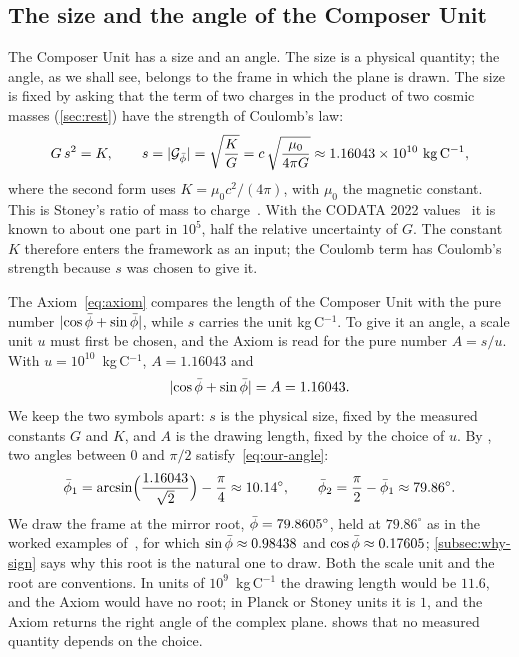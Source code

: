\subsection{The size and the angle of the Composer Unit}\label{subsec:our-plane}

The Composer Unit has a size and an angle. The size is a physical quantity; the angle, as we shall see, belongs to the frame in which the plane is drawn. The size is fixed by asking that the term of two charges in the product of two cosmic masses (\cref{sec:rest}) have the strength of Coulomb's law:
\begin{equation}\label{eq:cu-size}
G\,s^2 = K , \qquad s = \lvert\Gp\rvert = \sqrt{\frac{K}{G}} = c\,\sqrt{\frac{\mu_0}{4\pi G}} \approx 1.16043 \times 10^{10}\ \mathrm{kg\,C^{-1}} ,
\end{equation}
where the second form uses $K = \mu_0 c^2/(4\pi)$, with $\mu_0$ the magnetic constant. This is Stoney's ratio of mass to charge~\citep{Stoney1881}. With the CODATA 2022 values~\citep{CODATA2022} it is known to about one part in $10^5$, half the relative uncertainty of $G$. The constant $K$ therefore enters the framework as an input; the Coulomb term has Coulomb's strength because $s$ was chosen to give it.

The Axiom~\cref{eq:axiom} compares the length of the Composer Unit with the pure number $\lvert\cos\bar{\phi} + \sin\bar{\phi}\rvert$, while $s$ carries the unit kg\,C$^{-1}$. To give it an angle, a scale unit $u$ must first be chosen, and the Axiom is read for the pure number $A = s/u$. With $u = 10^{10}$~kg\,C$^{-1}$, $A = 1.16043$ and
\begin{equation}\label{eq:our-angle}
\lvert\cos\bar{\phi} + \sin\bar{\phi}\rvert = A = 1.16043 .
\end{equation}
We keep the two symbols apart: $s$ is the physical size, fixed by the measured constants $G$ and $K$, and $A$ is the drawing length, fixed by the choice of $u$.
By \citep[Theorem~3.6]{DerrazGN2026}, two angles between $0$ and $\pi/2$ satisfy~\cref{eq:our-angle}:
\[
\bar{\phi}_1 = \arcsin\Bigl(\frac{1.16043}{\sqrt{2}}\Bigr) - \frac{\pi}{4} \approx 10.14^\circ , \qquad \bar{\phi}_2 = \frac{\pi}{2} - \bar{\phi}_1 \approx 79.86^\circ .
\]
We draw the frame at the mirror root, $\bar{\phi} = 79.8605^\circ$, held at $79.86^\circ$ as in the worked examples of~\citep{DerrazGN2026}, for which $\sin\bar{\phi} \approx 0.98438$ and $\cos\bar{\phi} \approx 0.17605$; \cref{subsec:why-sign} says why this root is the natural one to draw. Both the scale unit and the root are conventions. In units of $10^{9}$~kg\,C$^{-1}$ the drawing length would be $11.6$, and the Axiom would have no root; in Planck or Stoney units it is $1$, and the Axiom returns the right angle of the complex plane.  shows that no measured quantity depends on the choice.


